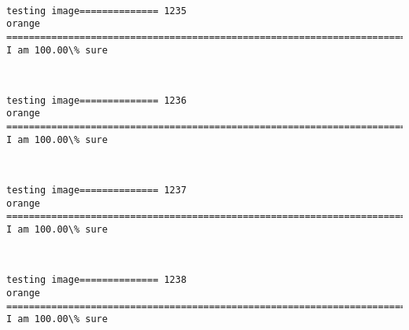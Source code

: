 \documentclass[11pt]{article}
\begin{document}
    \begin{center}
    \end{center}
    { \hspace*{\fill} \\}
    
    \begin{Verbatim}[commandchars=\\\{\}]
testing image============== 1235
orange
============================================================================
I am 100.00\% sure

    \end{Verbatim}

    \begin{center}
    \end{center}
    { \hspace*{\fill} \\}
    
    \begin{Verbatim}[commandchars=\\\{\}]
testing image============== 1236
orange
============================================================================
I am 100.00\% sure

    \end{Verbatim}

    \begin{center}
    \end{center}
    { \hspace*{\fill} \\}
    
    \begin{Verbatim}[commandchars=\\\{\}]
testing image============== 1237
orange
============================================================================
I am 100.00\% sure

    \end{Verbatim}

    \begin{center}
    \end{center}
    { \hspace*{\fill} \\}
    
    \begin{Verbatim}[commandchars=\\\{\}]
testing image============== 1238
orange
============================================================================
I am 100.00\% sure

    \end{Verbatim}
\end{document}
